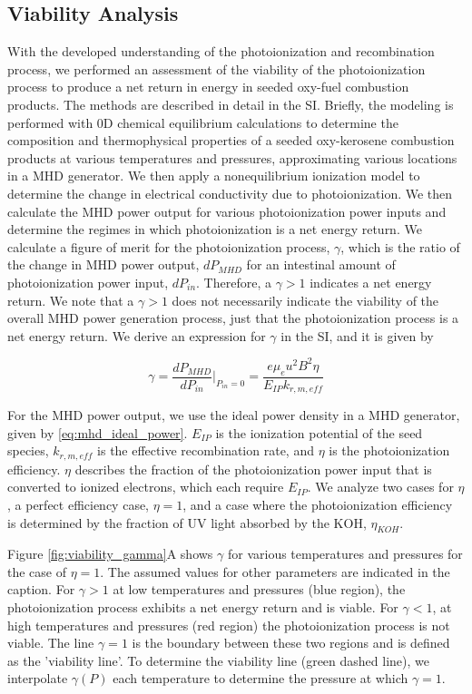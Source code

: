 \subsection{Viability Analysis}

With the developed understanding of the photoionization and recombination process, we performed an assessment of the viability of the photoionization process to produce a net return in energy in seeded oxy-fuel combustion products. The methods are described in detail in the SI. Briefly, the modeling is performed with 0D chemical equilibrium calculations to determine the composition and thermophysical properties of a seeded oxy-kerosene combustion products at various temperatures and pressures, approximating various locations in a MHD generator. We then apply a nonequilibrium ionization model to determine the change in electrical conductivity due to photoionization. We then calculate the MHD power output for various photoionization power inputs and determine the regimes in which photoionization is a net energy return. We calculate a figure of merit for the photoionization process, $\gamma$, which is the ratio of the change in MHD power output, $dP_{MHD}$ for an intestinal amount of photoionization power input, $dP_{in}$. Therefore, a $\gamma > 1$ indicates a net energy return. We note that a $\gamma > 1$ does not necessarily indicate the viability of the overall MHD power generation process, just that the photoionization process is a net energy return. We derive an expression for $\gamma$ in the SI, and it is given by


\begin{equation}
\gamma = \frac{dP_{MHD}}{dP_{in}} \Big|_{P_{in}=0} = \frac{e \mu_e u^2 B^2 \eta}{E_{IP}k_{r, m, eff}} 
\end{equation}


For the MHD power output, we use the ideal power density in a MHD generator, given by \ref{eq:mhd_ideal_power}. $E_{IP}$ is the ionization potential of the seed species, $k_{r, m, eff}$ is the effective recombination rate, and $\eta$ is the photoionization efficiency. $\eta$ describes the fraction of the photoionization power input that is converted to ionized electrons, which each require $E_{IP}$. We analyze two cases for $\eta$, a perfect efficiency case, $\eta=1$, and a case where the photoionization efficiency is determined by the fraction of UV light absorbed by the KOH, $\eta_{KOH}$. 

Figure \ref{fig:viability_gamma}A shows $\gamma$ for various temperatures and pressures for the case of $\eta=1$. The assumed values for other parameters are indicated in the caption.  For $\gamma > 1$ at low temperatures and pressures (blue region), the photoionization process exhibits a net energy return and is viable. For $\gamma < 1$, at high temperatures and pressures (red region) the photoionization process is not viable. The line $\gamma = 1$ is the boundary between these two regions and is defined as the 'viability line'. To determine the viability line (green dashed line), we interpolate $\gamma (P)$ each temperature to determine the pressure at which $\gamma = 1$. 

